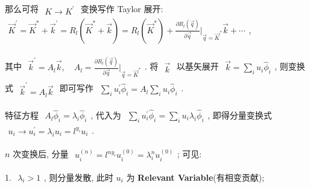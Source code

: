 \documentclass[../../main.tex]{subfiles}
\begin{document}
那么可将 $\begin{aligned}
    K\rightarrow K^{\prime}
\end{aligned}$ 变换写作 Taylor 展开: $\begin{aligned}
    \vec{K}^{\prime} = \vec{K}^{*} + \vec{k}^{\prime} = R_{l}\left(\vec{K}^{*} + \vec{k}\right) = R_{l}\left(\vec{K}^{*}\right) + \frac{\partial R_{l}\left(\vec{q}\right)}{\partial\vec{q}}\bigg|_{\vec{q}=\vec{K}^{*}}\vec{k} + \cdots
\end{aligned}$, 

其中 $\begin{aligned}
    \vec{k}^{\prime} = A_{l}\vec{k},\quad A_{l} = \frac{\partial R_{l}\left(\vec{q}\right)}{\partial\vec{q}}\bigg|_{\vec{q}=\vec{K}^{*}}
\end{aligned}$. 将 $\begin{aligned}
    \vec{k}
\end{aligned}$ 以基矢展开 $\begin{aligned}
    \vec{k} = \sum_{i}u_{i}\hat{\phi}_{i}
\end{aligned}$, 则变换式 $\begin{aligned}
    \vec{k}^{\prime} = A_{l}\vec{k}
\end{aligned}$ 即可写作 $\begin{aligned}
    \sum_{i}u_{i}^{\prime}\hat{\phi}_{i} = A_{l}\sum_{i}u_{i}\hat{\phi}_{i}
\end{aligned}$. 

特征方程 $\begin{aligned}
    A_{l}\hat{\phi}_{i} = \lambda_{i}\hat{\phi}_{i}
\end{aligned}$, 代入为 $\begin{aligned}
    \sum_{i}u_{i}^{\prime}\hat{\phi}_{i} = \sum_{i}u_{i}\lambda_{i}\hat{\phi}_{i}
\end{aligned}$, 即得分量变换式 $\begin{aligned}
    u_{i}\rightarrow u_{i}^{\prime} = \lambda_{i}u_{i} = l^{y_{i}}u_{i}
\end{aligned}$. 

$n$ 次变换后, 分量 $\begin{aligned}
    u_{i}^{(n)} = l^{ny_{i}}u_{i}^{(0)} = \lambda_{i}^{n}u_{i}^{(0)}
\end{aligned}$; 可见:

    1. $\begin{aligned}
    \lambda_{i} > 1
    \end{aligned}$, 则分量发散, 此时 $u_{i}$ 为 \textbf{Relevant Variable}(有相变贡献); 
\end{document}
